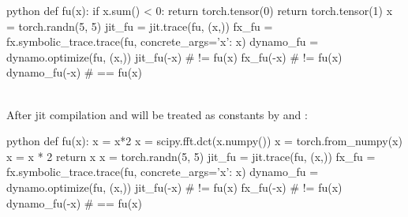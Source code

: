 \begin{examplebox}\nospacing
    \begin{example}\label{example:data_dependent_control_flow}\leavevmode
        \begin{plaincodebox}{python}
            def fu(x):
                if x.sum() < 0:
                    return torch.tensor(0)
                return torch.tensor(1)
            x = torch.randn(5, 5)
            jit_fu = jit.trace(fu, (x,))
            fx_fu = fx.symbolic_trace.trace(fu, concrete_args={'x': x})
            dynamo_fu = dynamo.optimize(fu, (x,))
            jit_fu(-x) # != fu(x)
            fx_fu(-x) # != fu(x)
            dynamo_fu(-x) # == fu(x)
        \end{plaincodebox}
    \end{example}
\end{examplebox}
\begin{examplebox}\nospacing
    \begin{example}\label{example:module_dependent_control_flow}\leavevmode\\
        After jit compilation and  will be treated as constants by  and :
        \begin{plaincodebox}{python}
        def fu(x):
            x = x*2
            x = scipy.fft.dct(x.numpy())
            x = torch.from_numpy(x)
            x = x * 2
            return x
        x = torch.randn(5, 5)
        jit_fu = jit.trace(fu, (x,))
        fx_fu = fx.symbolic_trace.trace(fu, concrete_args={'x': x})
        dynamo_fu = dynamo.optimize(fu, (x,))
        jit_fu(-x) # != fu(x)
        fx_fu(-x) # != fu(x)
        dynamo_fu(-x) # == fu(x)
        \end{plaincodebox}
    \end{example}
\end{examplebox}
